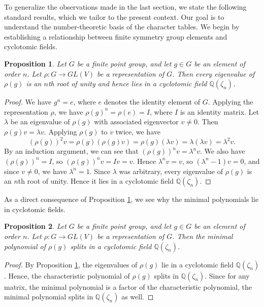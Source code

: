 \documentclass{article}
\newtheorem{proposition}{Proposition}
\begin{document}
    To generalize the observations made in the last section, we state the following standard results, which we tailor to the present context. Our goal is to understand the number-theoretic basis of the character tables. We begin by establishing a relationship between finite symmetry group elements and cyclotomic fields.
    \begin{proposition}
        Let $G$ be a finite point group, and let $g\in G$ be an element of order $n$. Let $\rho:G\to GL(V)$ be a representation of $G$. Then every eigenvalue of $\rho(g)$ is an $n$th root of unity and hence lies in a cyclotomic field $\mathbb{Q}(\zeta_n)$.
        \label{prop:eigcyc}
    \end{proposition}
    \begin{proof}
        We have $g^n=e$, where $e$ denotes the identity element of $G$. Applying the representation $\rho$, we have $\rho(g)^n=\rho(e)=I$, where $I$ is an identity matrix. Let $\lambda$ be an eigenvalue of $\rho(g)$ with associated eigenvector $v\neq0$. Then $\rho(g)v=\lambda v$. Applying $\rho(g)$ to $v$ twice, we have \[(\rho(g))^2v=\rho(g)(\rho(g)v)=\rho(g)(\lambda v)=\lambda(\lambda v)=\lambda^2v.\] By an induction argument, we can see that $(\rho(g))^nv=\lambda^nv$. We also have $(\rho(g))^n=I$, so $(\rho(g))^nv=Iv=v$. Hence $\lambda^nv=v$, so $(\lambda^n-1)v=0$, and since $v\neq0$, we have $\lambda^n=1$. Since $\lambda$ was arbitrary, every eigenvalue of $\rho(g)$ is an $n$th root of unity. Hence it lies in a cyclotomic field $\mathbb{Q}(\zeta_n)$.
    \end{proof}

    As a direct consequence of Proposition \ref{prop:eigcyc}, we see why the minimal polynomials lie in cyclotomic fields.

    \begin{proposition}
        Let $G$ be a finite point group, and let $g\in G$ be an element of order $n$. Let $\rho:G\to GL(V)$ be a representation of $G$. Then the minimal polynomial of $\rho(g)$ splits in a cyclotomic field $\mathbb{Q}(\zeta_n)$.
        \label{prop:minpolycyc}
    \end{proposition}
    \begin{proof}
        By Proposition \ref{prop:eigcyc}, the eigenvalues of $\rho(g)$ lie in a cyclotomic field $\mathbb{Q}(\zeta_n)$. Hence, the characteristic polynomial of $\rho(g)$ splits in $\mathbb{Q}(\zeta_n)$. Since for any matrix, the minimal polynomial is a factor of the characteristic polynomial, the minimal polynomial splits in $\mathbb{Q}(\zeta_n)$ as well.
    \end{proof}
\end{document}
